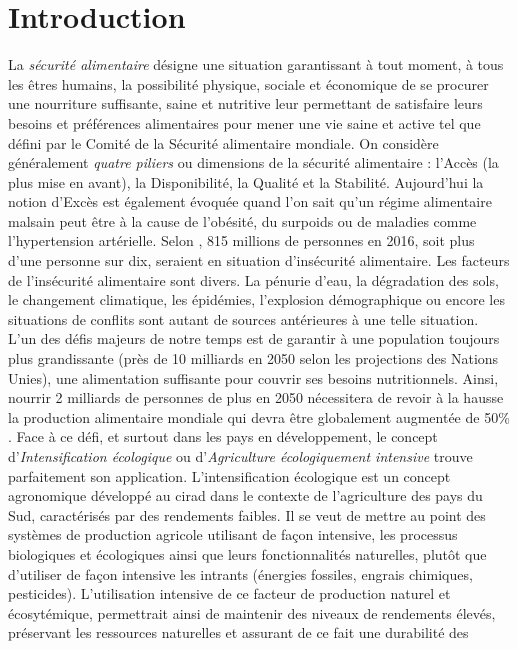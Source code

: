 \section{Introduction}

La \emph{sécurité alimentaire} désigne \og une situation garantissant à tout moment, à tous les êtres humains, la possibilité physique, sociale et économique 
de se procurer une nourriture suffisante, saine et nutritive leur permettant de satisfaire leurs besoins et préférences alimentaires pour mener une vie saine et active \fg{}
tel que défini par le Comité de la Sécurité alimentaire mondiale. On considère généralement \emph {quatre piliers} ou dimensions de la sécurité alimentaire : l'Accès (la plus mise 
en avant), la Disponibilité, la Qualité et la Stabilité. Aujourd'hui la notion d'Excès est également évoquée quand l'on sait qu'un régime alimentaire malsain peut être à la cause 
de l'obésité, du surpoids ou de maladies comme l'hypertension artérielle. Selon \citep{FAO2017}, 815 millions de personnes en 2016, soit plus d'une personne sur dix, 
seraient en situation d'insécurité alimentaire. Les facteurs de l'insécurité alimentaire sont divers. La pénurie d'eau, la dégradation des sols, le changement climatique, les épidémies, 
l'explosion démographique ou encore les situations de conflits sont autant de sources antérieures à une telle situation. \\L'un des défis majeurs de notre temps est de garantir à une 
population toujours plus grandissante (près de 10 milliards en 2050 selon les projections des Nations Unies), une alimentation suffisante pour couvrir ses besoins nutritionnels. 
Ainsi, nourrir 2 milliards de personnes de plus en 2050 nécessitera de revoir à la hausse la production alimentaire mondiale qui devra être globalement augmentée de 50\% . Face à ce défi, et surtout dans les pays en développement, le concept \og d'\emph{Intensification écologique} ou d'\emph{Agriculture écologiquement intensive} \fg{} trouve 
parfaitement son application. L'intensification écologique est un concept agronomique développé au \acrshort{cirad} dans le contexte de l'agriculture des pays du Sud, caractérisés par des 
rendements faibles. Il se veut de mettre au point des systèmes de production agricole utilisant de façon intensive, les processus biologiques et écologiques ainsi que leurs 
fonctionnalités naturelles, plutôt que d'utiliser de façon intensive les intrants (énergies fossiles, engrais chimiques, pesticides). L'utilisation intensive de ce facteur de 
production naturel et écosytémique, permettrait ainsi de maintenir des niveaux de rendements élevés, préservant les ressources naturelles et assurant de ce fait une durabilité des
